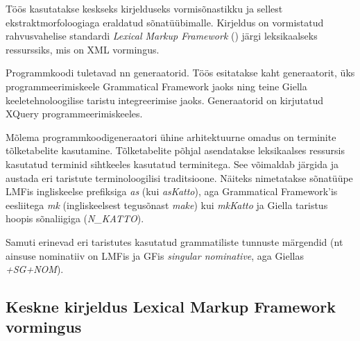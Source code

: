 \documentclass[12pt,a4paper]{article}
\begin{document}
Töös kasutatakse keskseks kirjelduseks vormisõnastikku ja sellest ekstrakt\-morfoloogiaga eraldatud sõnatüübi\-malle. Kirjeldus on vormistatud rahvusvahelise standardi \textit{Lexical Markup Framework} (\cite{iso/tc_37/sc_4_language_2007}) järgi leksikaalseks ressurssiks, mis on XML vormingus.

Programmkoodi tuletavad nn generaatorid. Töös esitatakse kaht generaatorit, üks programmeerimiskeele Grammatical Framework jaoks ning teine Giella keeletehnoloogilise taristu integreerimise jaoks. Generaatorid on kirjutatud XQuery programmeerimiskeeles.

Mõlema programmkoodi\-generaatori ühine arhitektuurne omadus on terminite tõlke\-tabelite kasutamine. Tõlke\-tabelite põhjal asendatakse leksikaalses ressursis kasutatud terminid sihtkeeles kasutatud terminitega. See võimaldab järgida ja austada eri taristute terminoloogilisi traditsioone. Näiteks nimetatakse sõnatüüpe LMFis ingliskeelse prefiksiga \textit{as} (kui \textit{asKatto}), aga Grammatical Framework'is eesliitega \textit{mk} (inglis\-keelsest tegusõnast \textit{make}) kui \textit{mkKatto} ja Giella taristus hoopis sõnaliigiga (\textit{N\_KATTO}).

Samuti erinevad eri taristutes kasutatud grammatiliste tunnuste märgendid (nt ainsuse nominatiiv on LMFis ja GFis \textit{singular nominative}, aga Giellas \textit{+SG+NOM}).



\subsection{Keskne kirjeldus Lexical Markup Framework vormingus}
\label{sec:lmf}
\end{document}
